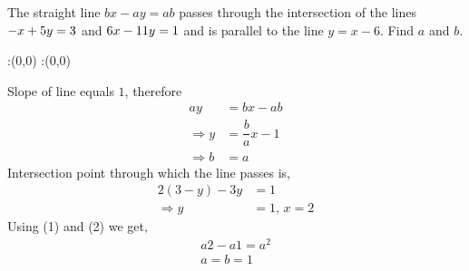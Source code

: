 \question The straight line $bx-ay = ab$ passes through the intersection of the lines $- x +5 y =3$ and $6 x-11 y =1$ 
and is parallel to the line $y=x-6$. Find $a$ and $b$.

\insertQR{}

\watchout

\ifprintanswers
  \begin{marginfigure}
      :(0,0)
      :(0,0)
    \figdrawbegin{}
      \figdrawline [100,101]
    \figdrawend
    \figvisu{\figBoxA}{}{%
    }
    \centerline{\box\figBoxA}
  \end{marginfigure}
\fi 


\begin{solution}
  Slope of line equals $1$, therefore
  \begin{align}
               ay &= bx-ab 				\nonumber \\
  	\Rightarrow y &= \dfrac{b}{a}x - 1  \nonumber \\
  	\Rightarrow b &= a
  \end{align}
  Intersection point through which the line passes is,
  \begin{align}  
    2(3-y) - 3y   &= 1 \nonumber \\    			
    \Rightarrow y &= 1\text{, }x = 2 
  \end{align}
  Using (1) and (2) we get,
  \begin{align}
    a2-a1=a^2 \nonumber \\
    a=b=1 \nonumber
  \end{align}
\end{solution}


